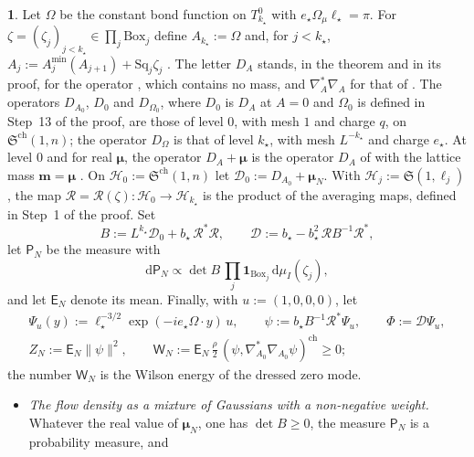 \documentclass[11pt]{amsart}
\newcommand{\namedhead}{}
\theoremstyle{definition}
\newtheorem*{namedinner}{\namedhead}
\newenvironment{named}[1]{\renewcommand{\namedhead}{#1}\begin{namedinner}}{\end{namedinner}}
\begin{document}
\begin{named}{Theorem 5.16}
Let $\Omega$ be the constant bond function on $T^0_{k_\star}$ with $e_\star\Omega_\mu\ell_\star=\pi$.
For $\zeta=(\zeta_j)_{j<k_\star}\in\prod_j\mathrm{Box}_j$ define $A_{k_\star}:=\Omega$ and, for $j<k_\star$, $A_j:=A^{\min}_j(A_{j+1})+\mathrm{Sq}_j\zeta_j$ \cite{QEDIII}.
The letter $D_A$ stands, in the theorem and in its proof, for the operator \cite[(I.2.3)]{QEDIII}, which contains no mass, and $\nabla^*_A\nabla_A$ for that of \cite[(I.2.4)]{QEDIII}.
The operators $D_{A_0}$, $D_0$ and $D_{\Omega_0}$, where $D_0$ is $D_A$ at $A=0$ \cite[Section~I.5.7]{QEDIII} and $\Omega_0$ is defined in Step~13 of the proof, are those of level $0$, with mesh $1$ and charge $q$, on $\mathfrak S^{\mathrm{ch}}(1,n)$;
the operator $D_\Omega$ is that of level $k_\star$, with mesh $L^{-k_\star}$ and charge $e_\star$.
At level $0$ and for real $\boldsymbol\mu$, the operator $D_A+\boldsymbol\mu$ is the operator $D_A$ of \cite[Definition~2.10]{QEDII} with the lattice mass $\mathbf m=\boldsymbol\mu$ \cite[(I.2.5); Section~I.9.3]{QEDIII}.
On $\mathcal H_0:=\mathfrak S^{\mathrm{ch}}(1,n)$ let $\mathcal D_0:=D_{A_0}+\boldsymbol\mu_N$.
With $\mathcal H_j:=\mathfrak S(1,\ell_j)$, the map $\mathcal R=\allowbreak \mathcal R(\zeta)\colon\mathcal H_0\to\mathcal H_{k_\star}$ is the product of the averaging maps, defined in Step~1 of the proof.
Set
\begin{equation*}
B:=L^{k_\star}\mathcal D_0+b_\star\,\mathcal R^*\mathcal R,\qquad\mathcal D:=b_\star-b_\star^2\,\mathcal R B^{-1}\mathcal R^*,
\end{equation*}
let $\mathsf P_N$ be the measure with
\begin{equation*}
\mathrm d\mathsf P_N\propto\det B\,\prod_j\mathbf 1_{\mathrm{Box}_j}\,\mathrm d\mu_I(\zeta_j),
\end{equation*}
and let $\mathsf E_N$ denote its mean.
Finally, with $u:=(1,0,0,0)$, let
\begin{gather*}
\Psi_u(y):=\ell_\star^{-3/2}\exp(-ie_\star\Omega\cdot y)\,u,\qquad\psi:=b_\star B^{-1}\mathcal R^*\Psi_u,\qquad\Phi:=\mathcal D\Psi_u,\\
Z_N:=\mathsf E_N\|\psi\|^2,\qquad\mathsf W_N:=\mathsf E_N\,\frac\rho2\,(\psi,\nabla^*_{A_0}\nabla_{A_0}\psi)^{\mathrm{ch}}\ge0;
\end{gather*}
the number $\mathsf W_N$ is the Wilson energy of the dressed zero mode.
\begin{itemize}
\item[(a)] \emph{The flow density as a mixture of Gaussians with a non-negative weight.}
Whatever the real value of $\boldsymbol\mu_N$, one has $\det B\ge0$, the measure $\mathsf P_N$ is a probability measure, and

\end{itemize}
\end{named}
\end{document}
